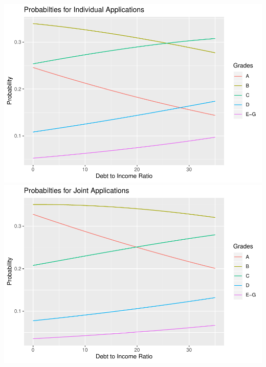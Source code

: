 \documentclass[11pt,]{article}
\begin{document}
\includegraphics{An-Analysis-of-LendingClub-Loan-Grades_files/figure-latex/unnamed-chunk-13-1.pdf}
\includegraphics{An-Analysis-of-LendingClub-Loan-Grades_files/figure-latex/unnamed-chunk-13-2.pdf}





\newpage
\singlespacing 
\end{document}
